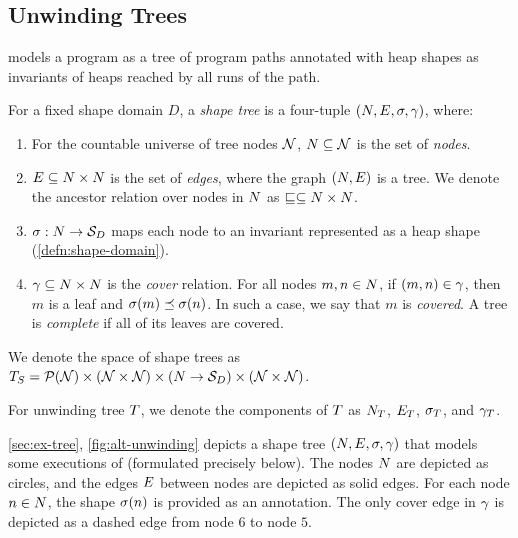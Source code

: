 \subsection{Unwinding Trees}
\label{sec:unwindings}
%
\verifier models a program as a tree of program paths annotated with
heap shapes as invariants of heaps reached by all runs of the path.
\begin{defn}
  \label{defn:shape-tree}
  For a fixed shape domain $D$, a \emph{shape tree} is a four-tuple
  $(N, E, \sigma, \gamma)$, where:
  \begin{enumerate}
  \item
    For the countable universe of tree nodes $\mathcal{N}$, $N
    \subseteq \mathcal{N}$ is the set of \emph{nodes}.
  \item
    $E \subseteq N \times N$ is the set of
    \emph{edges}, where the graph $(N, E)$ is a tree.
    We denote the ancestor relation over nodes in $N$ as $\sqsubseteq
    \subseteq N \times N$.
  \item
    $\sigma: N \to \mathcal{S}_D$ maps each node to an invariant
    represented as a heap shape (\autoref{defn:shape-domain}).
  \item
    $\gamma \subseteq N \times N$ is the \emph{cover}
    relation.
    For all nodes $m, n \in N$, if $(m, n) \in \gamma$, then
    $m$ is a leaf and $\sigma(m) \preceq \sigma(n)$.
    In such a case, we say that $m$ is \emph{covered}.
    A tree is \emph{complete} if all of its leaves are covered.
  \end{enumerate}
  We denote the space of shape trees as $T_S = \mathcal{P}(\mathcal{N})
  \times (\mathcal{N} \times \mathcal{N}) \times (N \to \mathcal{S}_D)
  \times (\mathcal{N} \times \mathcal{N})$.
\end{defn}
For unwinding tree $T$, we denote the components of $T$ as
$N_{T}$, $E_{T}$, $\sigma_{T}$, and
$\gamma_{T}$.
\begin{ex}
  \label{ex:pat-tree-defn}
  \autoref{sec:ex-tree}, \autoref{fig:alt-unwinding} depicts a shape
  tree $(N, E, \sigma, \gamma)$ that models some
  executions of \altlist (formulated precisely below).
  The nodes $N$ are depicted as circles, and the edges
  $E$ between nodes are depicted as solid edges.
  For each node $n \in N$, the shape $\sigma(n)$ is
  provided as an annotation.
  The only cover edge in $\gamma$ is depicted as a dashed edge from
  node $6$ to node $5$.
\end{ex}

